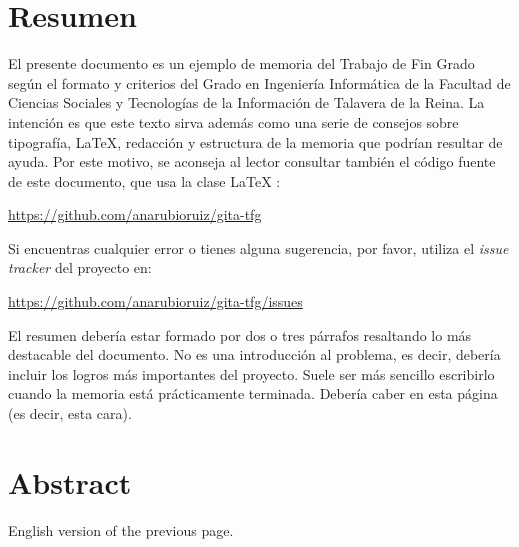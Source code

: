 \chapter{Resumen}

El presente documento es un ejemplo de memoria del Trabajo de Fin Grado según el formato y criterios del Grado en Ingeniería Informática de la Facultad de Ciencias Sociales y Tecnologías de la Información de Talavera de la Reina. La intención es que este texto sirva además como una serie de consejos sobre tipografía, \LaTeX, redacción y estructura de la memoria que podrían resultar de ayuda. Por este motivo, se aconseja al lector consultar también el código fuente de este documento, que usa la clase \LaTeX{} \gitatfg{}:

 \url{https://github.com/anarubioruiz/gita-tfg}

Si encuentras cualquier error o tienes alguna sugerencia, por favor, utiliza el \emph{issue tracker} del proyecto \gitatfg{} en:

\url{https://github.com/anarubioruiz/gita-tfg/issues}

El resumen debería estar formado por dos o tres párrafos resaltando lo más destacable del documento. No es una introducción al problema, es decir, debería incluir los logros más importantes del proyecto. Suele ser más sencillo escribirlo cuando la memoria está prácticamente terminada. Debería caber en esta página (es decir, esta cara).


\chapter{Abstract}

English version of the previous page.
